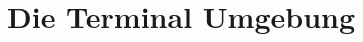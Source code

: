 \documentclass[oneside,bibliography=totocnumbered,BCOR=5mm]{scrbook}
\begin{document}
%
%

%
%



\section{Die Terminal Umgebung}
\end{document}
